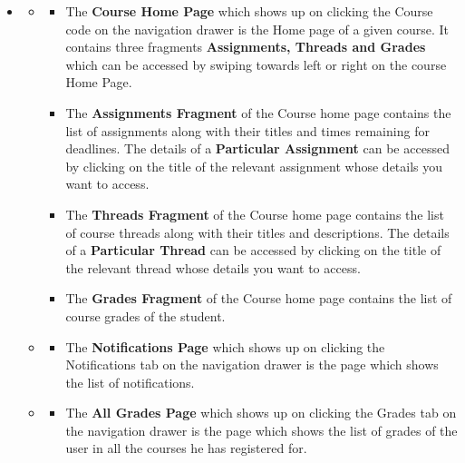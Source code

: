 \documentclass[12pt]{article}
\begin{document}
\begin{itemize}
    \item
    \begin{itemize}
        \item
        \begin{itemize}
        \item The \textbf{Course Home Page} which shows up on clicking the Course code on the navigation drawer is the Home page of a given course. It contains three fragments \textbf{Assignments, Threads and Grades} which can be accessed by swiping towards left or right on the course Home Page.
        \item The \textbf{Assignments Fragment} of the Course home page contains the list of assignments along with their titles and times remaining for deadlines. The details of a \textbf{Particular Assignment} can be accessed by clicking on the title of the relevant assignment whose details you want to access.
        \item The \textbf{Threads Fragment} of the Course home page contains the list of course threads along with their titles and descriptions. The details of a \textbf{Particular Thread} can be accessed by clicking on the title of the relevant thread whose details you want to access.
        \item The \textbf{Grades Fragment} of the Course home page contains the list of course grades of the student.
        \end{itemize}
        \item
        \begin{itemize}
        \item The \textbf{Notifications Page} which shows up on clicking the Notifications tab on the navigation drawer is the page which shows the list of notifications. 
        \end{itemize}
        \item
        \begin{itemize}
        \item The \textbf{All Grades Page} which shows up on clicking the Grades tab on the navigation drawer is the page which shows the list of grades of the user in all the courses he has registered for. 
        \end{itemize}
    \end{itemize}
\end{itemize}

\newpage
\end{document}
